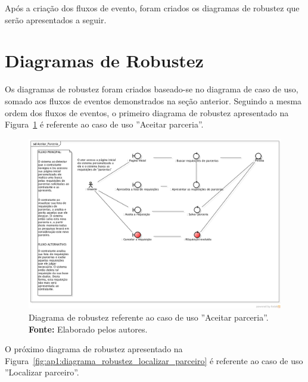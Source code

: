 Após a criação dos fluxos de evento, foram criados os diagramas de robustez que serão apresentados a seguir.

\section*{Diagramas de Robustez}

Os diagramas de robustez foram criados baseado-se no diagrama de caso de uso, somado aos fluxos de eventos demonstrados na seção anterior. Seguindo a mesma ordem dos fluxos de eventos, o primeiro diagrama de robustez apresentado na Figura~\ref{fig:ap1:diagrama_robustez_aceitar_parceria} é referente ao caso de uso ''Aceitar parceria''.

\newpage
\captionsetup[figure]{list=no}
\begin{figure}[h!]
	\centerline{\includegraphics[scale=0.38]{./imagens/apendices/diagrama-robustez-aceitar-parceria.png}}
	\caption[Diagrama de robustez referente ao caso de uso ''Aceitar parceria''.]
	{Diagrama de robustez referente ao caso de uso ''Aceitar parceria''. \textbf{Fonte:} Elaborado pelos autores.}
	\label{fig:ap1:diagrama_robustez_aceitar_parceria}
\end{figure}

O próximo diagrama de robustez apresentado na Figura~\ref{fig:ap1:diagrama_robustez_localizar_parceiro} é referente ao caso de uso ''Localizar parceiro''.

